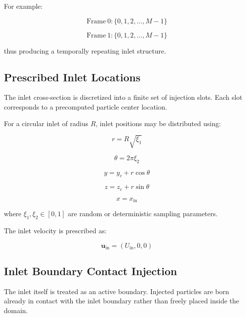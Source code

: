 \documentclass[11pt]{article}
\begin{document}
For example:

\begin{equation}
\mathrm{Frame}\ 0:
\{0,1,2,\dots,M-1\}
\end{equation}

\begin{equation}
\mathrm{Frame}\ 1:
\{0,1,2,\dots,M-1\}
\end{equation}

thus producing a temporally repeating inlet structure.

\subsection{Prescribed Inlet Locations}

The inlet cross-section is discretized into a finite set of injection slots. Each slot corresponds to a precomputed particle center location.

For a circular inlet of radius $R$, inlet positions may be distributed using:

\begin{equation}
r
=
R\sqrt{\xi_1}
\end{equation}

\begin{equation}
\theta
=
2\pi \xi_2
\end{equation}

\begin{equation}
y
=
y_c + r\cos\theta
\end{equation}

\begin{equation}
z
=
z_c + r\sin\theta
\end{equation}

\begin{equation}
x
=
x_{\mathrm{in}}
\end{equation}

where $\xi_1,\xi_2 \in [0,1]$ are random or deterministic sampling parameters.

The inlet velocity is prescribed as:

\begin{equation}
\mathbf{u}_{\mathrm{in}}
=
(U_{\mathrm{in}},0,0)
\end{equation}

\subsection{Inlet Boundary Contact Injection}

The inlet itself is treated as an active boundary. Injected particles are born already in contact with the inlet boundary rather than freely placed inside the domain.
\end{document}
